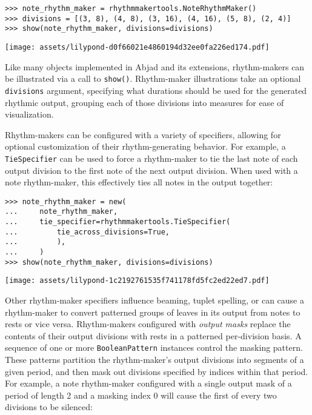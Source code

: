 \begin{singlespacing}
\vspace{-0.5\baselineskip}
\begin{lstlisting}
>>> note_rhythm_maker = rhythmmakertools.NoteRhythmMaker()
>>> divisions = [(3, 8), (4, 8), (3, 16), (4, 16), (5, 8), (2, 4)]
>>> show(note_rhythm_maker, divisions=divisions)
\end{lstlisting}
\noindent\texttt{[image: assets/lilypond-d0f66021e4860194d32ee0fa226ed174.pdf]}
\end{singlespacing}

\noindent Like many objects implemented in Abjad and its extensions,
rhythm-makers can be illustrated via a call to \texttt{show()}. Rhythm-maker
illustrations take an optional \texttt{divisions} argument, specifying what
durations should be used for the generated rhythmic output, grouping each of
those divisions into measures for ease of visualization.

Rhythm-makers can be configured with a variety of specifiers, allowing for
optional customization of their rhythm-generating behavior. For example, a
\texttt{TieSpecifier} can be used to force a rhythm-maker to tie the last note
of each output division to the first note of the next output division. When
used with a note rhythm-maker, this effectively ties all notes in the output
together:

\begin{comment}
<abjad>
note_rhythm_maker = new(
    note_rhythm_maker,
    tie_specifier=rhythmmakertools.TieSpecifier(
        tie_across_divisions=True,
        ),
    )
show(note_rhythm_maker, divisions=divisions)
</abjad>
\end{comment}

\begin{singlespacing}
\vspace{-0.5\baselineskip}
\begin{lstlisting}
>>> note_rhythm_maker = new(
...     note_rhythm_maker,
...     tie_specifier=rhythmmakertools.TieSpecifier(
...         tie_across_divisions=True,
...         ),
...     )
>>> show(note_rhythm_maker, divisions=divisions)
\end{lstlisting}
\noindent\texttt{[image: assets/lilypond-1c2192761535f741178fd5fc2ed22ed7.pdf]}
\end{singlespacing}

\noindent Other rhythm-maker specifiers influence beaming, tuplet spelling, or
can cause a rhythm-maker to convert patterned groups of leaves in its output
from notes to rests or vice versa. Rhythm-makers configured with \emph{output
masks} replace the contents of their output divisions with rests in a patterned
per-division basis. A sequence of one or more \texttt{BooleanPattern} instances
control the masking pattern. These patterns partition the rhythm-maker's output
divisions into segments of a given period, and then mask out divisions
specified by indices within that period. For example, a note rhythm-maker
configured with a single output mask of a period of length 2 and a masking
index 0 will cause the first of every two divisions to be silenced:

